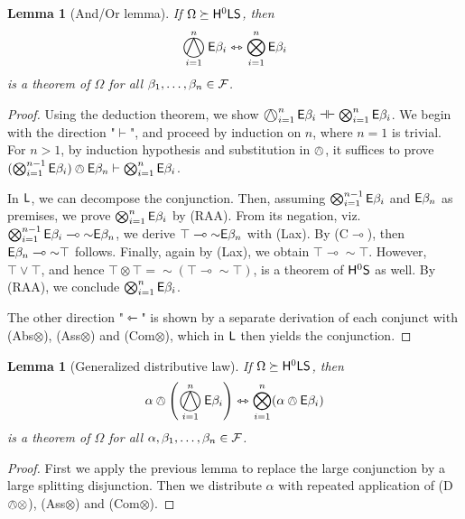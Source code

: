 \documentclass[a4paper,english,fleqn,11pt,final]{scrartcl}
\newcommand{\logicOpFont}[1]{\mathsf{#1}}
\newcommand{\negg}{{\sim}}
\newcommand{\E}{\protect\ensuremath\logicOpFont{E}}
\newcommand{\calF}{\protect\ensuremath{\mathcal{F}}}
\newcommand{\sfS}{\protect\ensuremath{\mathsf{S}}}
\newcommand{\sfH}{\protect\ensuremath{\mathsf{H}}}
\newcommand{\sfL}{\protect\ensuremath{\mathsf{L}}}
\newcommand{\limp}{\multimap}
\newcommand{\ltimp}{\leftarrowtriangle}
\newcommand{\tequiv}{\leftrightarrowtriangle}
\newcommand{\eqpr}{\dashv\vdash}
\newcommand{\tens}{\otimes}
\newcommand{\Deriv}[1]{{\normalfont\textsf{#1}}}
\newcommand{\oland}{\owedge}
\DeclareMathOperator*{\bigoland}{\scalerel*{\owedge}{\sum}}
\DeclareMathOperator*{\bigowedge}{\scalerel*{\owedge}{\sum}}
\DeclareMathOperator*{\bigtens}{\bigotimes}
\theoremstyle{plain}
\newtheorem{lemma}[theorem]{Lemma}
\theoremstyle{definition}
\begin{document}
\begin{lemma}[And/Or lemma]\label{lem:vee-swap}
If $\Omega \succeq \sfH^0\sfL\sfS$, then
\[
\bigowedge_{i=1}^n \E\beta_i \tequiv \bigtens_{i=1}^n \E\beta_i
\]
is a theorem of $\Omega$ for all $\beta_1,\ldots,\beta_n \in \calF$.
\end{lemma}
\begin{proof}
Using the deduction theorem, we show $\bigowedge_{i=1}^n \E\beta_i \eqpr \bigtens_{i=1}^n \E\beta_i$.
We begin with the direction "$\vdash$", and proceed by induction on $n$, where $n = 1$ is trivial.
For $n > 1$, by induction hypothesis and substitution in $\owedge$, it suffices to prove $(\bigtens_{i=1}^{n-1} \E\beta_i) \oland \E\beta_{n} \vdash \bigtens_{i=1}^n \E\beta_i$.

In $\sfL$, we can decompose the conjunction.
Then, assuming $\bigtens_{i=1}^{n-1}\E\beta_i$ and $\E\beta_n$ as premises, we prove $\bigtens_{i=1}^n \E\beta_i$ by \Deriv{(RAA)}.
From its negation, viz.\ $\bigotimes_{i=1}^{n-1}\E\beta_i \limp \negg\E\beta_n$,
we derive $\top \limp \negg\E\beta_n$ with \Deriv{(Lax)}.
By \Deriv{(C$\limp$)}, then $\E\beta_n \limp \negg \top$ follows.
Finally, again by \Deriv{(Lax)}, we obtain $\top \limp \negg \top$.
However, $\top \lor \top$, and hence $\top \tens \top = \negg(\top \limp \negg \top)$, is a theorem of $\sfH^0\sfS$ as well.
By \Deriv{(RAA)}, we conclude $\bigtens_{i=1}^n \E\beta_i$.

The other direction "$\ltimp$" is shown by a separate derivation of each conjunct with \Deriv{(Abs$\tens$)}, \Deriv{(Ass$\tens$)} and \Deriv{(Com$\tens$)}, which in $\sfL$ then yields the conjunction.
\end{proof}

\begin{lemma}[Generalized distributive law]\label{lem:distribute-alpha}
If $\Omega\succeq \sfH^0\sfL\sfS$, then
\[
\alpha \oland \left( \bigoland_{i=1}^n \E \beta_i\right) \tequiv \bigotimes_{i=1}^n (\alpha \oland \E\beta_i)
\]
is a theorem of $\Omega$ for all $\alpha,\beta_1,\ldots,\beta_n \in \calF$.
\end{lemma}
\begin{proof}
First we apply the previous lemma to replace the large conjunction by a large splitting disjunction.
Then we distribute $\alpha$ with repeated application of \Deriv{(D$\oland\tens$)}, \Deriv{(Ass$\tens$)} and \Deriv{(Com$\tens$)}.
\end{proof}
\end{document}
